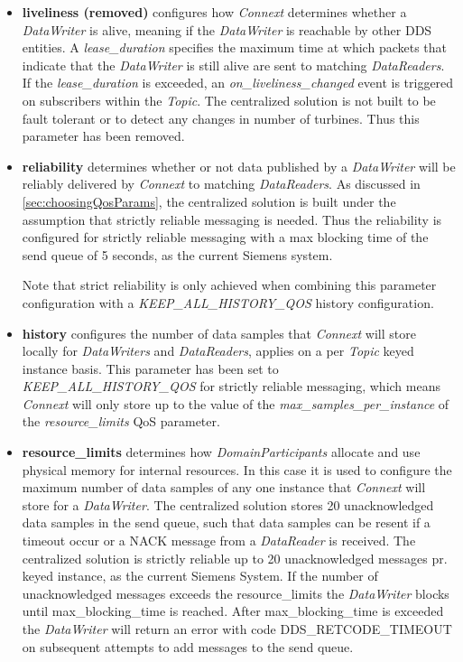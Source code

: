 \begin{itemize}
	\item \textbf{liveliness (removed)} configures how \textit{Connext} determines whether a \textit{DataWriter} is alive, meaning if the \textit{DataWriter} is reachable by other DDS entities. A \textit{lease\_duration} specifies the maximum time at which packets that indicate that the \textit{DataWriter} is still alive are sent to matching \textit{DataReaders}. If the \textit{lease\_duration} is exceeded, an \textit{on\_liveliness\_changed} event is triggered on subscribers within the \textit{Topic}. The centralized solution is not built to be fault tolerant or to detect any changes in number of turbines. Thus this parameter has been removed.
	
	\item \textbf{reliability} determines whether or not data published by a \textit{DataWriter} will be reliably delivered by \textit{Connext} to matching \textit{DataReaders}. As discussed in \cref{sec:choosingQosParams}, the centralized solution is built under the assumption that strictly reliable messaging is needed. Thus the reliability is configured for strictly reliable messaging with a max blocking time of the send queue of 5 seconds, as the current Siemens system.
	
	Note that strict reliability is only achieved when combining this parameter configuration with a \textit{KEEP\_ALL\_HISTORY\_QOS} history configuration.
	
	\item \textbf{history} configures the number of data samples that \textit{Connext} will store locally for \textit{DataWriters} and \textit{DataReaders}, applies on a per \textit{Topic} keyed instance basis. This parameter has been set to \textit{KEEP\_ALL\_HISTORY\_QOS} for strictly reliable messaging, which means \textit{Connext} will only store up to the value of the \textit{max\_samples\_per\-\_instance} of the \textit{resource\_limits} QoS parameter.
	
	\item \textbf{resource\_limits} determines how \textit{DomainParticipants} allocate and use physical memory for internal resources. In this case it is used to configure the maximum number of data samples of any one instance that \textit{Connext} will store for a \textit{DataWriter}. The centralized solution stores 20 unacknowledged data samples in the send queue, such that data samples can be resent if a timeout occur or a NACK message from a \textit{DataReader} is received. The centralized solution is strictly reliable up to 20 unacknowledged messages pr. keyed instance, as the current Siemens System. If the number of unacknowledged messages exceeds the resource\_limits the \textit{DataWriter} blocks until max\_blocking\_time is reached. After max\_blocking\_time is exceeded the \textit{DataWriter} will return an error with code DDS\_RETCODE\_TIMEOUT on subsequent attempts to add messages to the send queue.
	

\end{itemize}
